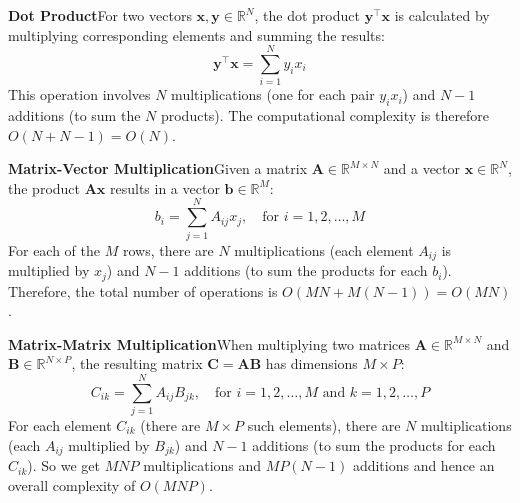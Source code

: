 \textbf{Dot Product}\quad For two vectors $ \mathbf{x}, \mathbf{y} \in \mathbb{R}^N $, the dot product $ \mathbf{y}^\top \mathbf{x} $ is calculated by multiplying corresponding elements and summing the results:
\begin{equation*}
    \mathbf{y}^\top \mathbf{x} = \sum_{i=1}^{N} y_i x_i
\end{equation*}
This operation involves $ N $ multiplications (one for each pair $ y_i x_i $) and $ N - 1 $ additions (to sum the $ N $ products). The computational complexity is therefore $ O(N + N - 1) = O(N) $.

\textbf{Matrix-Vector Multiplication}\quad Given a matrix $ \mathbf{A} \in \mathbb{R}^{M \times N} $ and a vector $ \mathbf{x} \in \mathbb{R}^N $, the product $ \mathbf{A}\mathbf{x} $ results in a vector $ \mathbf{b} \in \mathbb{R}^M $:
\begin{equation*}
    b_i = \sum_{j=1}^{N} A_{ij} x_j, \quad \text{for } i = 1, 2, \dots, M
\end{equation*}
For each of the $ M $ rows, there are $ N $ multiplications (each element $ A_{ij} $ is multiplied by $ x_j $) and $ N - 1 $ additions (to sum the products for each $ b_i $). Therefore, the total number of operations is $ O(MN + M(N - 1)) = O(MN) $.

\textbf{Matrix-Matrix Multiplication}\quad When multiplying two matrices $ \mathbf{A} \in \mathbb{R}^{M \times N} $ and $ \mathbf{B} \in \mathbb{R}^{N \times P} $, the resulting matrix $ \mathbf{C} = \mathbf{A}\mathbf{B} $ has dimensions $ M \times P $:
\begin{equation*}
    C_{ik} = \sum_{j=1}^{N} A_{ij} B_{jk}, \quad \text{for } i = 1, 2, \dots, M \text{ and } k = 1, 2, \dots, P
\end{equation*}
For each element $ C_{ik} $ (there are $ M \times P $ such elements), there are $ N $ multiplications (each $ A_{ij} $ multiplied by $ B_{jk} $) and $ N - 1 $ additions (to sum the products for each $ C_{ik} $). So we get $MNP$ multiplications and $MP(N-1)$ additions and hence an overall complexity of $O(MNP)$.



